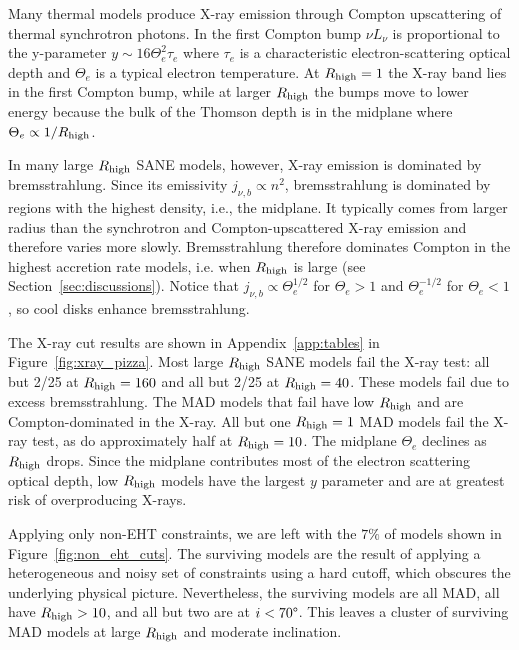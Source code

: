 
Many thermal models produce X-ray emission through Compton upscattering of thermal synchrotron photons.  In the first Compton bump $\nu L_\nu$ is proportional to the y-parameter $y \sim 16 \Theta_e^2 \tau_e$ where $\tau_e$ is a characteristic electron-scattering optical depth and $\Theta_e$ is a typical electron temperature.  At $R_\mathrm{high} = 1$ the X-ray band lies in the first Compton bump, while at larger $R_\mathrm{high}$ the bumps move to lower energy because the bulk of the Thomson depth is in the midplane where $\Theta_e \propto 1/R_\mathrm{high}$.

In many large $R_\mathrm{high}$ SANE models, however, X-ray emission is dominated by bremsstrahlung.  Since its emissivity $j_{\nu,b} \propto n^2$, bremsstrahlung is dominated by regions with the highest density, i.e., the midplane.  It typically comes from larger radius than the synchrotron and Compton-upscattered X-ray emission and therefore varies more slowly.  Bremsstrahlung therefore dominates Compton in the highest accretion rate models, i.e. when $R_\mathrm{high}$ is large (see Section~\ref{sec:discussions}).  Notice that $j_{\nu,b} \propto \Theta_e^{1/2}$ for $\Theta_e > 1$ and $\Theta_e^{-1/2}$ for $\Theta_e < 1$, so cool disks enhance bremsstrahlung.

The X-ray cut results are shown in Appendix~\ref{app:tables} in Figure~\ref{fig:xray_pizza}. Most large $R_\mathrm{high}$ SANE models fail the X-ray test: all but 2/25 at $R_\mathrm{high} = 160$ and all but 2/25 at $R_\mathrm{high} = 40$.  These models fail due to excess bremsstrahlung. The MAD models that fail have low $R_\mathrm{high}$ and are Compton-dominated in the X-ray.  All but one $R_\mathrm{high} = 1$ MAD models fail the X-ray test, as do approximately half at $R_\mathrm{high} = 10$.  The midplane $\Theta_e$ declines as $R_\mathrm{high}$ drops.  Since the midplane contributes most of the electron scattering optical depth, low $R_\mathrm{high}$ models have the largest $y$ parameter and are at greatest risk of overproducing X-rays. 


Applying only non-EHT constraints, we are left with the $7\%$ of models shown in Figure~\ref{fig:non_eht_cuts}. The surviving models are the result of applying a heterogeneous and noisy set of constraints using a hard cutoff, which obscures the underlying physical picture.  Nevertheless, the surviving models are all MAD, all have $R_\mathrm{high} > 10$, and all but two are at $i < 70\degree$.  This leaves a cluster of surviving MAD models at large $R_\mathrm{high}$ and moderate inclination.

